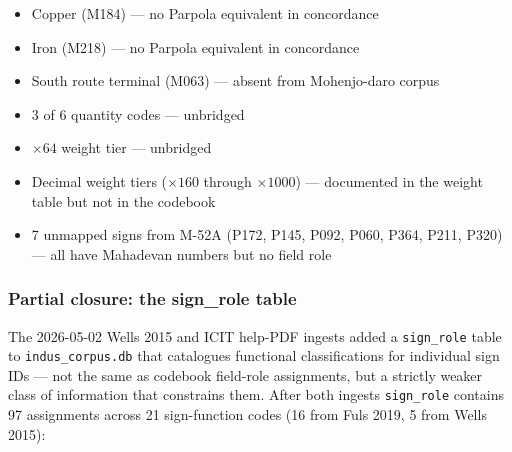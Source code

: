 \begin{itemize}
\item Copper (M184) --- no Parpola equivalent in concordance
\item Iron (M218) --- no Parpola equivalent in concordance
\item South route terminal (M063) --- absent from Mohenjo-daro corpus
\item 3 of 6 quantity codes --- unbridged
\item $\times 64$ weight tier --- unbridged
\item Decimal weight tiers ($\times 160$ through $\times 1000$)
  --- documented in the weight table but not in the codebook
\item 7 unmapped signs from M-52A (P172, P145, P092, P060, P364,
  P211, P320) --- all have Mahadevan numbers but no field role
\end{itemize}

\subsubsection*{Partial closure: the sign\_role table}

The 2026-05-02 Wells 2015 and ICIT help-PDF ingests added a
\texttt{sign\_role} table to \texttt{indus\_corpus.db} that catalogues
functional classifications for individual sign IDs --- not the same as
codebook field-role assignments, but a strictly weaker class of
information that constrains them. After both ingests
\texttt{sign\_role} contains 97 assignments across 21 sign-function
codes (16 from Fuls 2019, 5 from Wells 2015):

